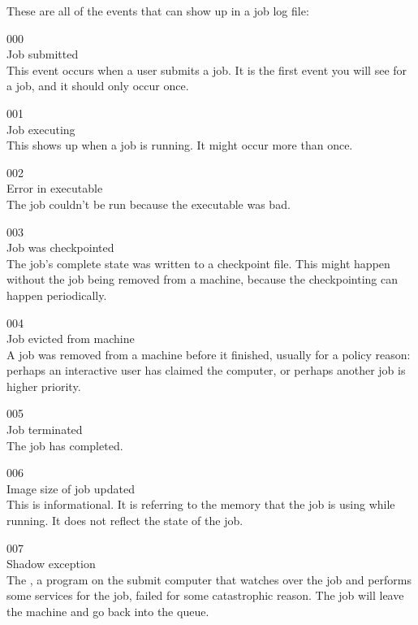 These are all of the events that can show up in a job log file:

\noindent{} 000 \\
 Job submitted \\
 This event occurs when a user submits a job.
It is the first event you will see for a job, and it should only occur
once. 

\noindent{} 001 \\
 Job executing \\
 This shows up when a job is running.
It might occur more than once.

\noindent{} 002 \\
 Error in executable \\
 The job couldn't be run because the
executable was bad.

\noindent{} 003 \\
 Job was checkpointed \\
 The job's complete state was written to a checkpoint
file.  
This might happen without the job being removed from a machine,
because the checkpointing can happen periodically. 

\noindent{} 004 \\
 Job evicted from machine \\
 A job was removed from a machine before it finished,
usually for a policy reason: perhaps an interactive user has claimed
the computer, or perhaps another job is higher priority.

\noindent{} 005 \\
 Job terminated \\
 The job has completed.

\noindent{} 006 \\
 Image size of job updated \\
 This is informational. 
It is referring to the memory that the job is using while running. It
does not reflect the state of the job.

\noindent{} 007 \\
 Shadow exception \\
The , a program on the submit computer that watches
over the job and performs some services for the job, failed for some
catastrophic reason. The job will leave the machine and go back into
the queue.

